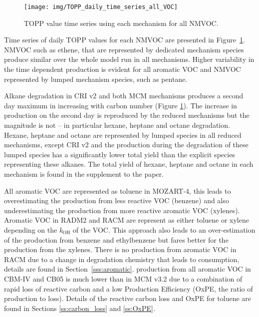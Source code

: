 \begin{figure}
    \centering
    \texttt{[image: img/TOPP\_daily\_time\_series\_all\_VOC]}
    \vspace{0mm}
    \caption{TOPP value time series using each mechanism for all NMVOC.}
    \vspace{-4mm}
    \label{f:TOPP_dailies}
\end{figure}

Time series of daily TOPP values for each NMVOC are presented in \mbox{Figure \ref{f:TOPP_dailies}}. 
NMVOC such as ethene, that are represented by dedicated mechanism species produce similar  over the whole model run in all mechanisms.
Higher variability in the time dependent  production is evident for all aromatic VOC and NMVOC represented by lumped mechanism species, such as pentane.

Alkane degradation in CRI v2 and both MCM mechanisms produces a second day maximum in  increasing with carbon number (Figure \ref{f:TOPP_dailies}).
The increase in  production on the second day is reproduced by the reduced mechanisms but the magnitude is not -- in particular hexane, heptane and octane degradation.
Hexane, heptane and octane are represented by lumped species in all reduced mechanisms, except CRI v2 and the  production during the degradation of these lumped species has a significantly lower total  yield than the explicit species representing these alkanes.
The total  yield of hexane, heptane and octane in each mechanism is found in the supplement to the paper.

All aromatic VOC are represented as toluene in MOZART-4, this leads to overestimating the  production from less reactive VOC (benzene) and also underestimating the  production from more reactive aromatic VOC (xylenes).
Aromatic VOC in RADM2 and RACM are represent as either toluene or xylene depending on the \textit{k}$_{\text{OH}}$ of the VOC.
This approach also leads to an over-estimation of the  production from benzene and ethylbenzene but fares better for the  production from the xylenes.
There is no  production from aromatic VOC in RACM due to a change in degradation chemistry that leads to  consumption, details are found in \mbox{Section \ref{sss:aromatic}}.
 production from all aromatic VOC in CBM-IV and CB05 is much lower than in MCM v3.2 due to a combination of rapid loss of reactive carbon and a low  Production Efficiency (OxPE, the ratio of  production to  loss).
Details of the reactive carbon loss and OxPE for toluene are found in Sections \ref{ss:carbon_loss} and \ref{ss:OxPE}.

